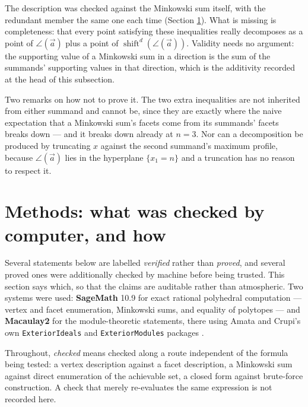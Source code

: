 \documentclass[11pt, a4paper, abstract=yes]{scrartcl}
\theoremstyle{definition}
\theoremstyle{remark}
\theoremstyle{plain}
\newcommand{\shift}{\operatorname{shift}}
\newcommand{\rasimp}{\angle}
\let\autocite\cite
\begin{document}
The description was checked against the Minkowski sum itself, with the redundant member the same one
each time (Section \ref{sec-methods}). What is missing is completeness: that every point satisfying these inequalities really
decomposes as a point of \(\rasimp(\vec a)\) plus a point of \(\shift^d(\rasimp(\vec a))\). Validity needs no
argument: the supporting value of a Minkowski sum in a direction is the sum of the summands'
supporting values in that direction, which is the additivity recorded at the head of this
subsection.

Two remarks on how not to prove it. The two extra inequalities are not inherited from either summand
and cannot be, since they are exactly where the naive expectation that a Minkowski sum's facets come
from its summands' facets breaks down --- and it breaks down already at \(n=3\). Nor can a
decomposition be produced by truncating \(x\) against the second summand's maximum profile, because
\(\rasimp(\vec a)\) lies in the hyperplane \(\lbrace x_1=n\rbrace\) and a truncation has no reason to
respect it.
\section{Methods: what was checked by computer, and how}
\label{sec-methods}
Several statements below are labelled \emph{verified} rather than \emph{proved}, and several proved ones were
additionally checked by machine before being trusted. This section says which, so that the claims
are auditable rather than atmospheric. Two systems were used: \textbf{\textbf{SageMath}} 10.9 for exact rational
polyhedral computation --- vertex and facet enumeration, Minkowski sums, and equality of polytopes
--- and \textbf{\textbf{Macaulay2}} for the module-theoretic statements, there using Amata and Crupi's own
\texttt{ExteriorIdeals} and \texttt{ExteriorModules} packages
\autocite{AmataCrupi2018ExteriorIdeals,AmataCrupi2021,Macaulay2,SageMath}.

Throughout, \emph{checked} means checked along a route independent of the formula being tested: a vertex
description against a facet description, a Minkowski sum against direct enumeration of the
achievable set, a closed form against brute-force construction. A check that merely re-evaluates
the same expression is not recorded here.
\end{document}
